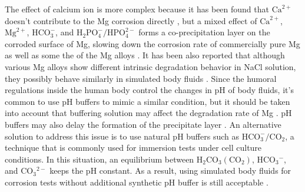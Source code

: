 The effect of calcium ion is more complex because it has been found that $\mathrm{Ca}^{2+}$ doesn't contribute to the Mg corrosion directly \cite{Willumeit-Roemer2019}, but a mixed effect of $\mathrm{Ca}^{2+}$, $\mathrm{Mg}^{2+}$, $\mathrm{HCO}_{3}^{-}$, and $\mathrm{H}_{2} \mathrm{PO}_{4}^{-} / \mathrm{HPO}_{4}^{2-}$ forms a co-precipitation layer on the corroded surface of Mg, slowing down the corrosion rate of commercially pure Mg as well as some the of the Mg alloys \cite{Mei2019,Lamaka2018}. It has been also reported that although various Mg alloys show different intrinsic degradation behavior in NaCl solution, they possibly behave similarly in simulated body fluids \cite{Agha2016,Mei2019a}. Since the humoral regulations inside the human body control the changes in pH of body fluids, it's common to use pH buffers to mimic a similar condition, but it should be taken into account that buffering solution may affect the degradation rate of Mg \cite{Cui2017,Kannan2017}. pH buffers may also delay the formation of the precipitate layer \cite{Lamaka2018}. An alternative solution to address this issue is to use natural pH buffers such as $\mathrm{HCO}_{3}^{-}/\mathrm{CO}_{2}$, a technique that is commonly used for immersion tests under cell culture conditions. In this situation, an equilibrium between $\mathrm{H}_{2} \mathrm{CO}_{3}\left(\mathrm{CO}_{2}\right)$, $\mathrm{HCO}_{3}{ }^{-}$, and $\mathrm{CO}_{3}{ }^{2-}$ keeps the pH constant. As a result, using simulated body fluids for corrosion tests without additional synthetic pH buffer is still acceptable \cite{Lamaka2018,Mei2019a}.

